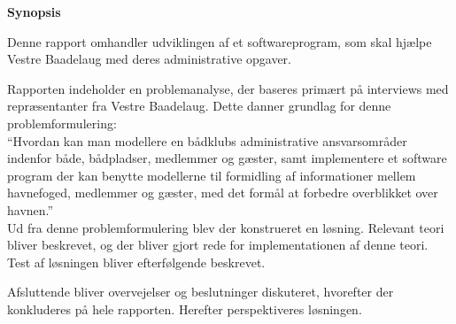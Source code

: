 \begin{center}\textbf{Synopsis}\\ \end{center}

Denne rapport omhandler udviklingen af et softwareprogram, som skal hjælpe Vestre Baadelaug med deres administrative opgaver.

Rapporten indeholder en problemanalyse, der baseres primært på interviews med repræsentanter fra Vestre Baadelaug. Dette danner grundlag for denne problemformulering:\\

\enquote{Hvordan kan man modellere en bådklubs administrative ansvarsområder indenfor både, bådpladser, medlemmer og gæster, samt implementere et software program der kan benytte modellerne til formidling af informationer mellem havnefoged, medlemmer og gæster, med det formål at forbedre overblikket over havnen.}\\
	
Ud fra denne problemformulering blev der konstrueret en løsning. Relevant teori bliver beskrevet, og der bliver gjort rede for implementationen af denne teori. Test af løsningen bliver efterfølgende beskrevet.

Afsluttende bliver overvejelser og beslutninger diskuteret, hvorefter der konkluderes på hele rapporten. Herefter perspektiveres løsningen.